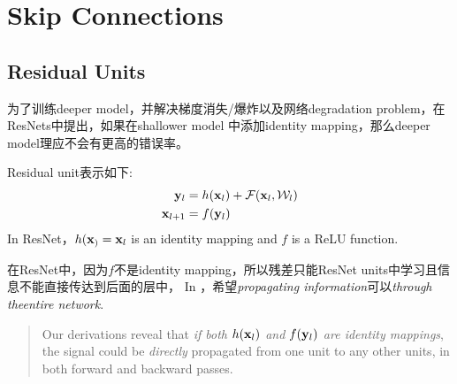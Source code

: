 \chapter{Skip Connections}

\section{Residual Units}
为了训练deeper model，并解决梯度消失/爆炸以及网络degradation problem，在ResNets\cite{He2016resnet}中提出，如果在shallower model
中添加identity mapping，那么deeper model理应不会有更高的错误率。
\par
Residual unit表示如下:
\begin{equation}
    \begin{split}
        \mathbf{y}_l &= h(\mathbf{x}_l) + \mathcal{F}(\mathbf{x}_l, \mathcal{W}_l) \\
        \mathbf{x}_{l+1} &= f(\mathbf{y}_l)
    \end{split}
\end{equation}
In ResNet，$h(\mathbf{x}_) = \mathbf{x}_l$ is an identity mapping and $f$ is a ReLU function.
\par
在ResNet中，因为$f$不是identity mapping，所以残差只能ResNet units中学习且信息不能直接传达到后面的层中，
In \cite{He2016identity}，希望\textit{propagating information}可以\textit{through theentire network}.
\begin{quotation}
    Our derivations reveal that \textit{if both $h(\mathbf{x}_l)$ and
$f(\mathbf{y}_l)$ are identity mappings}, the signal could be \textit{directly}
propagated from one unit to any other units, in both forward and backward passes.\cite{He2016identity}
\end{quotation}

